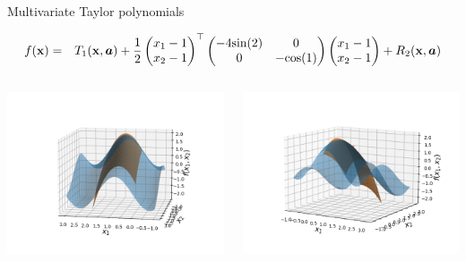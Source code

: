 \documentclass[11pt,compress,t,notes=noshow, xcolor=table]{beamer}
\begin{document}
\begin{vbframe}{Multivariate Taylor polynomials}
\begin{footnotesize}
  \begin{eqnarray*}
    f(\mathbf{x}) &=& T_1(\mathbf{x}, \bm{a}) + \frac{1}{2}\begin{pmatrix}x_1 - 1 \\ x_2 - 1 \end{pmatrix}^\top \begin{pmatrix} -4 \text{sin}(2) & 0 \\ 0 & -\text{cos}(1) \end{pmatrix} \begin{pmatrix}x_1 - 1 \\ x_2 - 1 \end{pmatrix} + R_2(\mathbf{x}, \bm{a})
  \end{eqnarray*}
  \vspace*{-0.2cm}
  \end{footnotesize}
  \begin{columns}
    \begin{column}{0.3\textwidth}
      \includegraphics[width = \textwidth]{figure_man/Taylor2D/Taylor2D_2nd-100.png}
    \end{column}
    \begin{column}{0.3\textwidth}
      \includegraphics[width = \textwidth]{figure_man/Taylor2D/Taylor2D_2nd-301.png}

\end{column}
\end{columns}
\end{vbframe}
\end{document}
